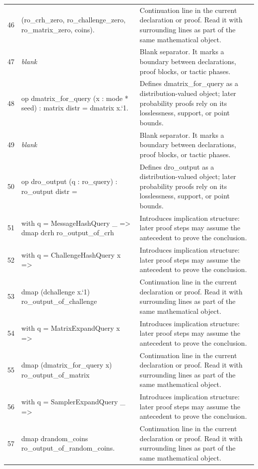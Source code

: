 \documentclass[10pt]{article}
\begin{document}
\begin{longtable}{r L{0.53\textwidth} L{0.37\textwidth}}
46 & {\ttfamily\scriptsize   (ro\_crh\_zero, ro\_challenge\_zero, ro\_matrix\_zero, coins).} & Continuation line in the current declaration or proof.  Read it with surrounding lines as part of the same mathematical object. \\
47 & {\ttfamily\scriptsize \emph{blank}} & Blank separator.  It marks a boundary between declarations, proof blocks, or tactic phases. \\
48 & {\ttfamily\scriptsize op dmatrix\_for\_query (x : mode * seed) : matrix distr = dmatrix x.`1.} & Defines dmatrix\_for\_query as a distribution-valued object; later probability proofs rely on its losslessness, support, or point bounds. \\
49 & {\ttfamily\scriptsize \emph{blank}} & Blank separator.  It marks a boundary between declarations, proof blocks, or tactic phases. \\
50 & {\ttfamily\scriptsize op dro\_output (q : ro\_query) : ro\_output distr =} & Defines dro\_output as a distribution-valued object; later probability proofs rely on its losslessness, support, or point bounds. \\
51 & {\ttfamily\scriptsize   with q = MessageHashQuery \_ => dmap dcrh ro\_output\_of\_crh} & Introduces implication structure: later proof steps may assume the antecedent to prove the conclusion. \\
52 & {\ttfamily\scriptsize   with q = ChallengeHashQuery x =>} & Introduces implication structure: later proof steps may assume the antecedent to prove the conclusion. \\
53 & {\ttfamily\scriptsize     dmap (dchallenge x.`1) ro\_output\_of\_challenge} & Continuation line in the current declaration or proof.  Read it with surrounding lines as part of the same mathematical object. \\
54 & {\ttfamily\scriptsize   with q = MatrixExpandQuery x =>} & Introduces implication structure: later proof steps may assume the antecedent to prove the conclusion. \\
55 & {\ttfamily\scriptsize     dmap (dmatrix\_for\_query x) ro\_output\_of\_matrix} & Continuation line in the current declaration or proof.  Read it with surrounding lines as part of the same mathematical object. \\
56 & {\ttfamily\scriptsize   with q = SamplerExpandQuery \_ =>} & Introduces implication structure: later proof steps may assume the antecedent to prove the conclusion. \\
57 & {\ttfamily\scriptsize     dmap drandom\_coins ro\_output\_of\_random\_coins.} & Continuation line in the current declaration or proof.  Read it with surrounding lines as part of the same mathematical object. \\

\end{longtable}
\end{document}
